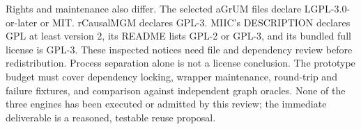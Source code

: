 Rights and maintenance also differ. The selected aGrUM files declare
LGPL-3.0-or-later or MIT. rCausalMGM declares GPL-3. MIIC's DESCRIPTION declares
GPL at least version 2, its README lists GPL-2 or GPL-3, and its bundled full
license is GPL-3. These inspected notices need file and dependency review
before redistribution. Process separation alone is not a license conclusion.
The prototype budget must cover dependency locking, wrapper maintenance,
round-trip and failure fixtures, and comparison against independent graph
oracles. None of the three engines has been executed or admitted by this
review; the immediate deliverable is a reasoned, testable reuse proposal.
\label{exec14:cxx-latent-end}

